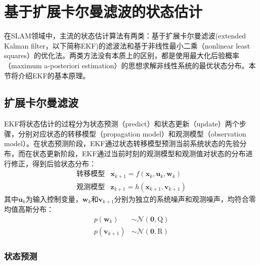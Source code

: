 \section{基于扩展卡尔曼滤波的状态估计}

在SLAM领域中，主流的状态估计算法有两类：基于扩展卡尔曼滤波(extended Kalman filter，以下简称EKF)的滤波法和基于非线性最小二乘（nonlinear least squares）的优化法。两类方法没有本质上的区别，都是使用最大化后验概率（maximum a-posteriori estimation）的思想求解非线性系统的最优状态分布。本节将介绍EKF的基本原理。

\subsection{扩展卡尔曼滤波}

EKF将状态估计的过程分为状态预测（predict）和状态更新（update）两个步骤，分别对应状态的转移模型（propagation model）和观测模型（observation model）。在状态预测阶段，EKF通过状态转移模型预测当前系统状态的先验分布，而在状态更新阶段，EKF通过当前时刻的观测模型和观测值对状态的分布进行修正，得到后验状态分布：
\begin{equation}
\begin{array}{rl}
    \text{转移模型} & \bm{x}_{k+1} = f(\bm{x}_k,\bm{u}_k,\bm{w}_k) \\
    \text{观测模型} & \bm{z}_{k+1} = h(\bm{x}_{k+1},\bm{v}_{k+1})
\end{array}
\end{equation}
其中$\bm{u}_k$为输入控制变量，$\bm{w}_k$和$\bm{v}_{k+1}$分别为独立的系统噪声和观测噪声，均符合零均值高斯分布：
\begin{equation}
\begin{aligned}
    p(\bm{w}_k)     &\sim \mathcal{N}(\bm{0},\mathrm{Q}) \\
    p(\bm{v}_{k+1}) &\sim \mathcal{N}(\bm{0},\mathrm{R})
\end{aligned}
\end{equation}

\subsubsection{状态预测}


